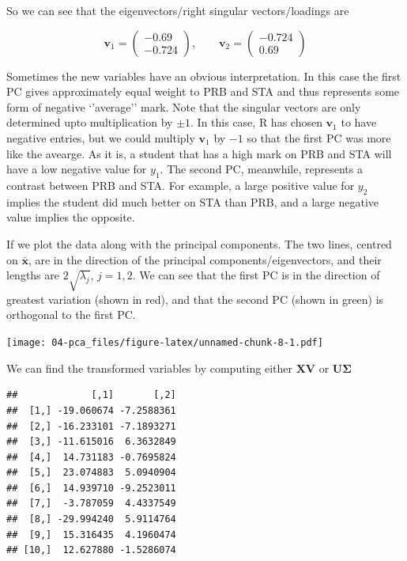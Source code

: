 \documentclass[]{book}
\newenvironment{Shaded}{\begin{snugshade}}{\end{snugshade}}
\newcommand{\NormalTok}[1]{#1}
\newcommand{\OperatorTok}[1]{\textcolor[rgb]{0.81,0.36,0.00}{\textbf{#1}}}
\newcommand{\StringTok}[1]{\textcolor[rgb]{0.31,0.60,0.02}{#1}}
\theoremstyle{definition}
\theoremstyle{definition}
\theoremstyle{definition}
\theoremstyle{remark}
\begin{document}
So we can see that the eigenvectors/right singular vectors/loadings are

\[\mathbf v_1=\begin{pmatrix} -0.69 \\ -0.724 \end{pmatrix},\qquad \mathbf v_2=\begin{pmatrix} -0.724 \\ 0.69 \end{pmatrix}\]

Sometimes the new variables have an obvious interpretation. In this case the first PC gives approximately equal weight to PRB and STA and thus represents some form of negative `'average'' mark. Note that the singular vectors are only determined upto multiplication by \(\pm 1\). In this case, R has chosen \(\mathbf v_1\) to have negative entries, but we could multiply \(\mathbf v_1\) by \(-1\) so that the first PC was more like the avearge.
As it is, a student that has a high mark on PRB and STA will have a low negative value for \(y_1\). The second PC, meanwhile, represents a contrast between PRB and STA. For example, a large positive value for \(y_2\) implies the student did much better on STA than PRB, and a large negative value implies the opposite.

If we plot the data along with the principal components. The two lines, centred on \(\bar{\mathbf x}\), are in the direction of the principal components/eigenvectors, and their lengths are \(2 \sqrt{\lambda_j}\), \(j=1,2\).
We can see that the first PC is in the direction of greatest variation (shown in red), and that the second PC (shown in green) is orthogonal to the first PC.

\texttt{[image: 04-pca\_files/figure-latex/unnamed-chunk-8-1.pdf]}

We can find the transformed variables by computing either \(\mathbf X\mathbf V\) or \(\mathbf U\boldsymbol{\Sigma}\)

\begin{Shaded}
\end{Shaded}

\begin{verbatim}
##             [,1]       [,2]
##  [1,] -19.060674 -7.2588361
##  [2,] -16.233101 -7.1893271
##  [3,] -11.615016  6.3632849
##  [4,]  14.731183 -0.7695824
##  [5,]  23.074883  5.0940904
##  [6,]  14.939710 -9.2523011
##  [7,]  -3.787059  4.4337549
##  [8,] -29.994240  5.9114764
##  [9,]  15.316435  4.1960474
## [10,]  12.627880 -1.5286074
\end{verbatim}
\end{document}
